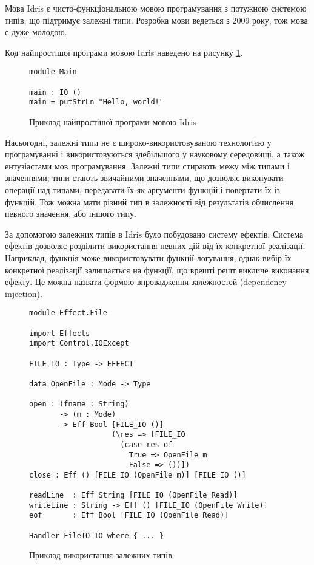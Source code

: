 \documentclass[main.tex]{subfiles}
\begin{document}
Мова Idris\cite{idris} є чисто-функціональною мовою програмування з потужною системою типів, що підтримує залежні типи. Розробка мови ведеться з 2009 року\cite{idris:first-release}, тож мова є дуже молодою.

Код найпростішої програми мовою Idris наведено на рисунку \ref{example:idris}.

\begin{figure}[h]
  \centering
  \begin{verbatim}
module Main

main : IO ()
main = putStrLn "Hello, world!"
  \end{verbatim}
  \caption{Приклад найпростішої програми мовою Idris}
  \label{example:idris}
\end{figure}

Насьогодні, залежні типи не є широко-використовуваною технологією у програмуванні і використовуються здебільшого у науковому середовищі, а також ентузіастами мов програмування. Залежні типи стирають межу між типами і значеннями; типи стають звичайними значеннями, що дозволяє виконувати операції над типами, передавати їх як аргументи функцій і повертати їх із функцій. Тож можна мати різний тип в залежності від результатів обчислення певного значення, або іншого типу.

За допомогою залежних типів в Idris було побудовано систему ефектів. Система ефектів дозволяє розділити використання певних дій від їх конкретної реалізації. Наприклад, функція може використовувати функції логування, однак вибір їх конкретної реалізації залишається на функції, що врешті решт викличе виконання ефекту. Це можна назвати формою впровадження залежностей (dependency injection).

\begin{figure}%
  \centering
  \begin{verbatim}
module Effect.File

import Effects
import Control.IOExcept

FILE_IO : Type -> EFFECT

data OpenFile : Mode -> Type

open : (fname : String)
       -> (m : Mode)
       -> Eff Bool [FILE_IO ()]
                   (\res => [FILE_IO
                     (case res of
                       True => OpenFile m
                       False => ())])
close : Eff () [FILE_IO (OpenFile m)] [FILE_IO ()]

readLine  : Eff String [FILE_IO (OpenFile Read)]
writeLine : String -> Eff () [FILE_IO (OpenFile Write)]
eof       : Eff Bool [FILE_IO (OpenFile Read)]

Handler FileIO IO where { ... }
  \end{verbatim}
  \caption{Приклад використання залежних типів}
  \label{idris:dependent-types}
\end{figure}
\end{document}
